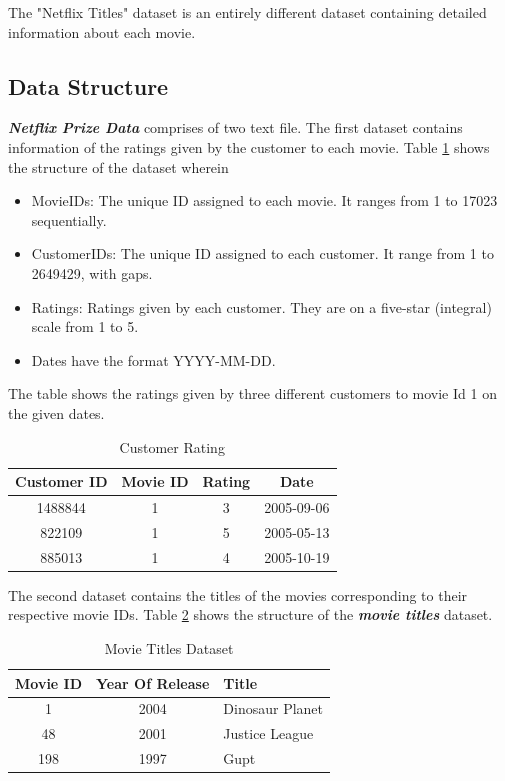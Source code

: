 \documentclass[a4paper,10pt]{article}
\begin{document}
The "Netflix Titles" dataset is an entirely different dataset containing detailed information about each movie.

\subsection{Data Structure}

\textbf{\textit{Netflix Prize Data}} comprises of two text file. The first dataset contains information of the ratings given by the customer to each movie. Table \ref{Data_1} shows the structure of the dataset wherein 

\begin{itemize}
  \item MovieIDs: The unique ID assigned to each movie. It ranges from 1 to 17023 sequentially.
  \item CustomerIDs: The unique ID assigned to each customer. It range from 1 to 2649429, with gaps.
  \item Ratings: Ratings given by each customer. They are on a five-star (integral) scale from 1 to 5.
  \item Dates have the format YYYY-MM-DD.
\end{itemize}
The table shows the ratings given by three different customers to movie Id 1 on the given dates. 






\begin{table}
    \center 
    
    \begin{tabular}{|c|c|c|c|} \hline 
         Customer ID&  Movie ID&  Rating& Date\\ \hline 
         1488844&  1&  3& 2005-09-06
\\ \hline 
         822109&  1&  5& 2005-05-13
\\ \hline 
         885013&  1&  4& 2005-10-19
\\ \hline
    \end{tabular}
    \caption{Customer Rating}   
    \label{Data_1} 
\end{table}

The second dataset contains the titles of the movies corresponding to their respective movie IDs. Table \ref{Movie_titles} shows the structure of the \textit{\textbf{movie titles}} dataset. 

\begin{table}
    \centering
    \begin{tabular}{|c|c|l|} \hline 
         Movie ID& Year Of Release&Title\\ \hline 
         1& 2004&Dinosaur Planet\\ \hline 
         48&  2001&Justice League\\ \hline 
         198
&  1997&Gupt\\ \hline
    \end{tabular}
    \caption{Movie Titles Dataset}
    \label{Movie_titles}
\end{table}
\end{document}
